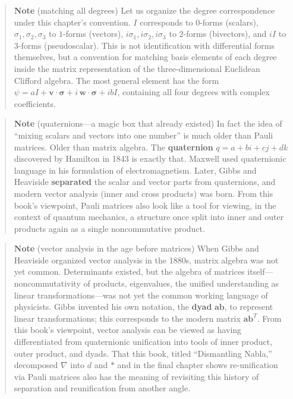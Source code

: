 \documentclass[a4paper,12pt,openany]{book}
\begin{document}
\begin{quote}
\textbf{Note} (matching all degrees) Let us organize the degree
correspondence under this chapter's convention. \(I\) corresponds to
\(0\)-forms (scalars), \(\sigma_1,\sigma_2,\sigma_3\) to \(1\)-forms
(vectors), \(i\sigma_1,i\sigma_2,i\sigma_3\) to \(2\)-forms (bivectors),
and \(iI\) to \(3\)-forms (pseudoscalar). This is not identification
with differential forms themselves, but a convention for matching basis
elements of each degree inside the matrix representation of the
three-dimensional Euclidean Clifford algebra. The most general element
has the form
\(\psi = aI + \mathbf{v}\!\cdot\!\bm{\sigma} + i\,\mathbf{w}\!\cdot\!\bm{\sigma} + ibI\),
containing all four degrees with complex coefficients.
\end{quote}

\begin{quote}
\textbf{Note} (quaternions—a magic box that already existed) In fact
the idea of ``mixing scalars and vectors into one number'' is much older
than Pauli matrices. Older than matrix algebra. The \textbf{quaternion}
\(q = a + bi + cj + dk\) discovered by Hamilton in 1843 is exactly that.
Maxwell used quaternionic language in his formulation of
electromagnetism. Later, Gibbs and Heaviside \textbf{separated} the
scalar and vector parts from quaternions, and modern vector analysis
(inner and cross products) was born. From this book's viewpoint, Pauli
matrices also look like a tool for viewing, in the context of quantum
mechanics, a structure once split into inner and outer products again as
a single noncommutative product.
\end{quote}

\begin{quote}
\textbf{Note} (vector analysis in the age before matrices) When Gibbs
and Heaviside organized vector analysis in the 1880s, matrix algebra was
not yet common. Determinants existed, but the algebra of matrices
itself—noncommutativity of products, eigenvalues, the unified
understanding as linear transformations—was not yet the common working
language of physicists. Gibbs invented his own notation, the
\textbf{dyad} \(\mathbf{a}\mathbf{b}\), to represent linear
transformations; this corresponds to the modern matrix
\(\mathbf{a}\mathbf{b}^T\). From this book's viewpoint, vector analysis
can be viewed as having differentiated from quaternionic unification
into tools of inner product, outer product, and dyads. That this book,
titled ``Dismantling Nabla,'' decomposed \(\nabla\) into \(d\) and
\(\ast\) and in the final chapter shows re-unification via Pauli
matrices also has the meaning of revisiting this history of separation
and reunification from another angle.
\end{quote}
\end{document}
